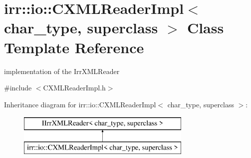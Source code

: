 \hypertarget{classirr_1_1io_1_1_c_x_m_l_reader_impl}{\section{irr\-:\-:io\-:\-:C\-X\-M\-L\-Reader\-Impl$<$ char\-\_\-type, superclass $>$ Class Template Reference}
\label{classirr_1_1io_1_1_c_x_m_l_reader_impl}
}


implementation of the Irr\-X\-M\-L\-Reader  




{\ttfamily \#include $<$C\-X\-M\-L\-Reader\-Impl.\-h$>$}

Inheritance diagram for irr\-:\-:io\-:\-:C\-X\-M\-L\-Reader\-Impl$<$ char\-\_\-type, superclass $>$\-:\begin{figure}[H]
\begin{center}
\leavevmode
\includegraphics[height=2.000000cm]{classirr_1_1io_1_1_c_x_m_l_reader_impl}
\end{center}
\end{figure}
